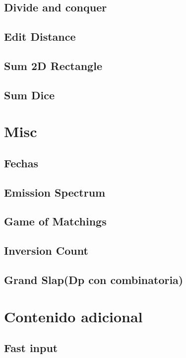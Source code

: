 \documentclass[oneside]{book}
\begin{document}
	\section{Divide and conquer}
	
	\section{Edit Distance}
	
	\section{Sum 2D Rectangle}
	
	\section{Sum Dice}
	
	\chapter{Misc}
	\section{Fechas}
	
	\section{Emission Spectrum}
	
	\section{Game of Matchings}
	
	\section{Inversion Count}
	
	\section{Grand Slap(Dp con combinatoria)}
	
	
	\chapter{Contenido adicional}
	\section{Fast input}
	
	\newpage
\end{document}
